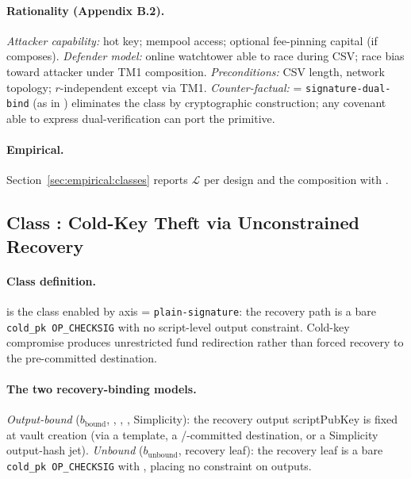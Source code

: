\paragraph{Rationality (Appendix B.2).} \emph{Attacker capability:}
hot key; mempool access; optional fee-pinning capital (if \classfee{}
composes). \emph{Defender model:} online watchtower able to race
during CSV; race bias toward attacker under TM1 composition.
\emph{Preconditions:} CSV length, network topology; $r$-independent
except via TM1.
\emph{Counter-factual:} \axwdbind{} = \texttt{signature-dual-bind}
(as in \catcsfs{}) eliminates the class by cryptographic construction;
any covenant able to express dual-verification can port the
primitive.

\paragraph{Empirical.} Section~\ref{sec:empirical:classes} reports
$\mathcal{L}$ per design and the composition with \classfee{}.

\subsection{Class \classcold{}: Cold-Key Theft via Unconstrained Recovery}
\label{sec:imposs:class_cold}

\paragraph{Class definition.} \classcold{} is the class enabled by
axis \axrecbind{} = \texttt{plain-signature}: the recovery path is a
bare \texttt{cold\_pk OP\_CHECKSIG} with no script-level
output constraint. Cold-key compromise produces unrestricted fund
redirection rather than forced recovery to the pre-committed
destination.

\paragraph{The two recovery-binding models.} \emph{Output-bound}
($b_{\text{bound}}$, \opctv{}, \opvault{}, \opccv{}, Simplicity): the
recovery output scriptPubKey is fixed at vault creation (via a
\opctv{} template, a \opvault{}/\opccv{}-committed destination, or a
Simplicity output-hash jet). \emph{Unbound}
($b_{\text{unbound}}$, \catcsfs{} recovery leaf): the recovery leaf
is a bare \texttt{cold\_pk OP\_CHECKSIG} with ,
placing no constraint on outputs.

